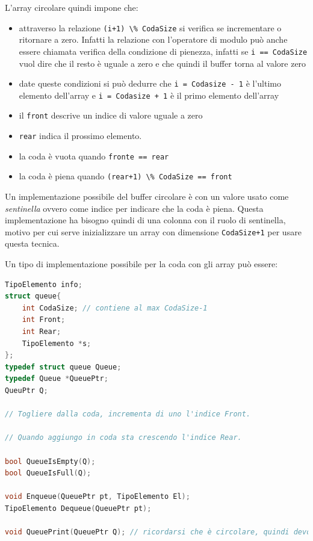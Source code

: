 \documentclass[
  paper=a4,
  oneside  ,captions=tableheading
]{scrbook}
\newcommand{\passthrough}[1]{#1}
\providecommand{\tightlist}{%
  \setlength{\itemsep}{0pt}\setlength{\parskip}{0pt}}
\begin{document}
L'array circolare quindi impone che:

\begin{itemize}
\tightlist
\item
  attraverso la relazione \passthrough{\lstinline!(i+1) \% CodaSize!} si
  verifica se incrementare o ritornare a zero. Infatti la relazione con
  l'operatore di modulo può anche essere chiamata verifica della
  condizione di pienezza, infatti se
  \passthrough{\lstinline!i == CodaSize!} vuol dire che il resto è
  uguale a zero e che quindi il buffer torna al valore zero
\item
  date queste condizioni si può dedurre che
  \passthrough{\lstinline!i = Codasize - 1!} è l'ultimo elemento
  dell'array e \passthrough{\lstinline!i = Codasize + 1!} è il primo
  elemento dell'array
\item
  il \passthrough{\lstinline!front!} descrive un indice di valore uguale
  a zero
\item
  \passthrough{\lstinline!rear!} indica il prossimo elemento.
\item
  la coda è vuota quando \passthrough{\lstinline!fronte == rear!}
\item
  la coda è piena quando
  \passthrough{\lstinline!(rear+1) \% CodaSize == front!}
\end{itemize}

Un implementazione possibile del buffer circolare è con un valore usato
come \emph{sentinella} ovvero come indice per indicare che la coda è
piena. Questa implementazione ha bisogno quindi di una colonna con il
ruolo di sentinella, motivo per cui serve inizializzare un array con
dimensione \passthrough{\lstinline!CodaSize+1!} per usare questa
tecnica.

Un tipo di implementazione possibile per la coda con gli array può
essere:

\begin{lstlisting}[language={C++}]
TipoElemento info;
struct queue{
    int CodaSize; // contiene al max CodaSize-1
    int Front;
    int Rear;
    TipoElemento *s;
};
typedef struct queue Queue;
typedef Queue *QueuePtr;
QueuPtr Q;

// Togliere dalla coda, incrementa di uno l'indice Front.

// Quando aggiungo in coda sta crescendo l'indice Rear.

bool QueueIsEmpty(Q);
bool QueueIsFull(Q);

void Enqueue(QueuePtr pt, TipoElemento El);
TipoElemento Dequeue(QueuePtr pt);

void QueuePrint(QueuePtr Q); // ricordarsi che è circolare, quindi devo usare il modulo
\end{lstlisting}
\end{document}
